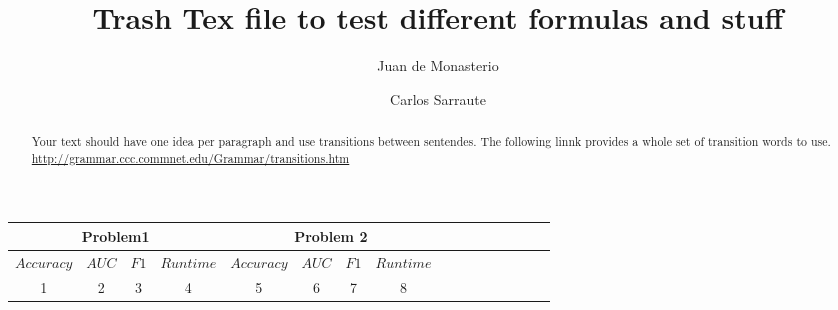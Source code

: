\documentclass{article}%
\newcommand{\Expect}{{\mathbb{E}}}
\theoremstyle{definition}
\begin{document}
\title{Trash Tex file to test different formulas and stuff}




\author{
	Juan de Monasterio
	\and Carlos Sarraute
}

%
%


\maketitle
\begin{abstract}
	Your text should have one idea per paragraph and use transitions between sentendes. The following linnk provides a whole set of transition words to use.
	\url{http://grammar.ccc.commnet.edu/Grammar/transitions.htm}
	
	



\end{abstract} 

\begin{tabular}{|*{16}{c|}}  %
	\hline
	\multicolumn{4}{|c}{Problem1} & \multicolumn{4}{|c|}{Problem 2} \\ \hline 
	\multicolumn{1}{|c}{$Accuracy$} & \multicolumn{1}{|c|}{$AUC$} & \multicolumn{1}{|c|}{$F1$} & \multicolumn{1}{c|}{$Runtime$} & 
	\multicolumn{1}{|c}{$Accuracy$} & \multicolumn{1}{|c|}{$AUC$} & \multicolumn{1}{|c|}{$F1$} & \multicolumn{1}{c|}{$Runtime$}
	\\ \hline 
	1 & 2 & 3 & 4 & 5 & 6 & 7 & 8 \\ \hline
	
\end{tabular}
\end{document}

